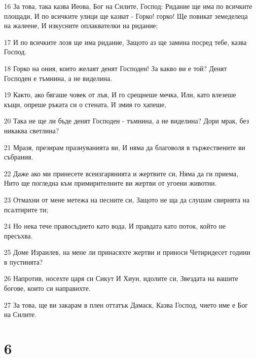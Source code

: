 \par 16 За това, така казва Иеова, Бог на Силите, Господ: Ридание ще има по всичките площади, И по всичките улици ще казват - Горко! горко! Ще повикат земеделеца на жалеене, И изкусните оплаквателки на ридание;
\par 17 И по всичките лозя ще има ридание, Защото аз ще замина посред тебе, казва Господ.
\par 18 Горко на ония, които желаят денят Господен! За какво ви е той? Денят Господен е тъмнина, а не виделина.
\par 19 Както, ако бягаше човек от лъв, И го срещнеше мечка, Или, като влезеше  къщи, опреше ръката си о стената, И змия го хапеше,
\par 20 Така не ще ли бъде денят Господен - тъмнина, а не виделина? Дори мрак, без никаква светлина?
\par 21 Мразя, презирам празнуванията ви, И няма да благоволя в тържествените ви събрания.
\par 22 Даже ако ми принесете всеизгарянията и жертвите си, Няма да ги приема, Нито ще погледна към примирителните ви жертви от угоени животни.
\par 23 Отмахни от мене метежа на песните си, Защото не ща да слушам свирнята на псалтирите ти;
\par 24 Но нека тече правосъдието като вода, И правдата като поток, който не пресъхва.
\par 25 Доме Израилев, на мене ли принасяхте жертви и приноси Четиридесет години в пустинята?
\par 26 Напротив, носехте царя си Сикут И Хиун, идолите си, Звездата на вашите богове, които си направихте.
\par 27 За това, ще ви закарам в плен оттатък Дамаск, Казва Господ, чието име е Бог на Силите.

\chapter{6}

